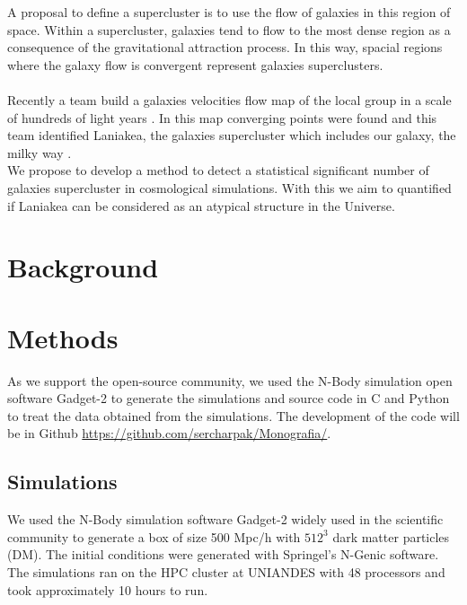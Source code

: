 \documentclass[12pt]{article}
\begin{document}
A proposal to define a supercluster is to use the flow of galaxies in this region of
space. Within a supercluster, galaxies tend to flow to the most dense region as a
consequence of the gravitational attraction process. In this way, spacial regions where
the galaxy flow is convergent represent galaxies superclusters.\\
\\
Recently a team build a galaxies velocities flow map of the local group in a scale of
hundreds of light years \cite{tully_cosmicflows-2_2013}. In this map converging points
were found and this team identified Laniakea, the galaxies supercluster which includes
our galaxy, the milky way \cite{tully_laniakea_2014}.
\\   

We propose to develop a method to detect a statistical significant number of galaxies
supercluster in cosmological simulations. 
With this we aim to quantified if Laniakea can be considered as an atypical structure in
the Universe. 
\\

\section{Background}

\section{Methods}

As we support the open-source community, we used the N-Body simulation open
software Gadget-2 \cite{springel_gadget_2_2005} to generate the simulations
and source code in C and Python to treat the data obtained from the
simulations. The development of the code will be in Github \url{https://github.com/sercharpak/Monografia/}.

\subsection{Simulations}
We used the N-Body simulation software Gadget-2 \cite{springel_gadget_2_2005}
widely used in the scientific community to generate a box of size 500 Mpc/h
with $512^{3}$ dark matter particles (DM). The initial conditions were
generated with Springel's N-Genic software. The simulations ran on the HPC cluster at UNIANDES with 48 processors and took approximately 10 hours to run. \\
\end{document}
